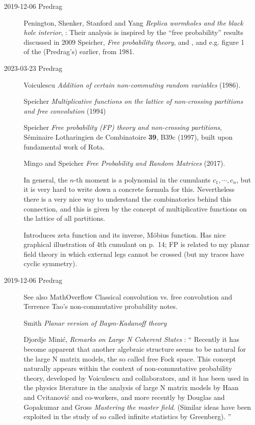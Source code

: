 \begin{description}
\item[2019-12-06 Predrag]
\label{post:PSSY19}
Penington, Shenker, Stanford and Yang
{\em Replica wormholes and the black hole interior},
:
Their analysis is inspired by the ``free probability'' results discussed
in 2009 Speicher, {\em Free probability theory},
 and , and e.g. figure 1 of the (Predrag's)
earlier, from 1981.

   \item[2023-03-23 Predrag]
Voiculescu
{\em Addition of certain non-commuting random variables} (1986).

Speicher {\em Multiplicative functions on the lattice of
non-crossing partitions and free convolution} (1994)

Speicher {\em Free probability (FP) theory and non-crossing partitions},
S{\'e}minaire Lotharingien de Combinatoire
     {{\bf 39}, B39c} (1997),
built upon fundamental work of Rota.

Mingo and Speicher
{\em Free Probability and Random Matrices} (2017).

In general, the $n$-th moment is a polynomial in the cumulants $c_1, \cdots ,
c_n$, but it is very hard to write down a concrete formula for this.
Nevertheless there is a very nice way to understand the combinatorics
behind this connection, and this is given by the concept of multiplicative
functions on the lattice of all partitions.

Introduces zeta function and its inverse, M{\"o}bius function. Has nice
graphical illustration of 4th cumulant on p.~14; FP is related to my planar
field theory in which external legs cannot be crossed (but my traces have
cyclic symmetry).


\item[2019-12-06 Predrag]
See also MathOverflow
{Classical convolution vs. free convolution}
and Terrence Tao's
{non-commutative probability} notes.

Smith {\em Planar version of {Baym-Kadanoff} theory}

Djordje Mini\'c, {\em Remarks on Large N Coherent States}
: `` Recently it has become apparent that another
algebraic structure seems to be natural for the large N matrix models,
the so called free Fock space. This concept naturally appears within the
context of non-commutative probability theory, developed by Voiculescu
and collaborators, and it has been used in the physics
literature in the analysis of large N matrix models by Haan and
Cvitanovi\'c and co-workers\emph{}, and more recently by
Douglas and Gopakumar and Gross {\em Mastering
the master field}. (Similar ideas have been exploited in the study of so
called infinite statistics by Greenberg).
''


\end{description}
